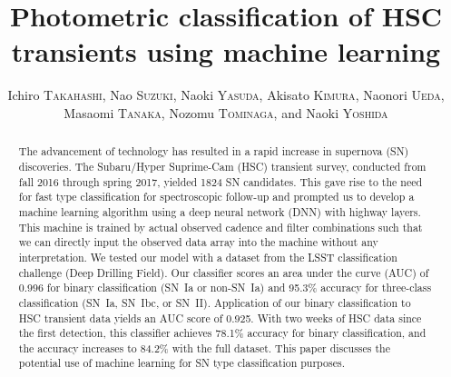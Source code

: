 \documentclass[useamsfonts]{pasj01}
\begin{document}
\title{Photometric classification of HSC transients using machine learning}
\author{
Ichiro \textsc{Takahashi},
Nao \textsc{Suzuki},
Naoki \textsc{Yasuda},
Akisato \textsc{Kimura},
Naonori \textsc{Ueda},
Masaomi \textsc{Tanaka},
Nozomu \textsc{Tominaga},
and
Naoki \textsc{Yoshida}
%
}%



\maketitle
%
\begin{abstract}
The advancement of technology has resulted in a rapid increase in supernova (SN) discoveries. The Subaru/Hyper Suprime-Cam (HSC) transient survey, conducted from fall 2016 through spring 2017, yielded 1824 SN candidates. This gave rise to the need for fast type classification for spectroscopic follow-up and prompted us to develop a machine learning algorithm using a deep neural network (DNN) with highway layers. 
This machine is trained by actual observed cadence and filter combinations such that we can directly input the observed data array into the machine without any interpretation. We tested our model with a dataset from the LSST classification challenge (Deep Drilling Field).
Our classifier scores an area under the curve (AUC) of 0.996 for binary classification (SN~Ia or non-SN~Ia) and 95.3\% accuracy for three-class classification (SN~Ia, SN~Ibc, or SN~II). Application of our binary classification to HSC transient data yields an AUC score of 0.925. With two weeks of HSC data since the first detection, this classifier achieves 78.1\% accuracy for binary classification, and the accuracy increases to 84.2\% with the full dataset. This paper discusses the potential use of machine learning for SN type classification purposes.
\end{abstract}
\end{document}
